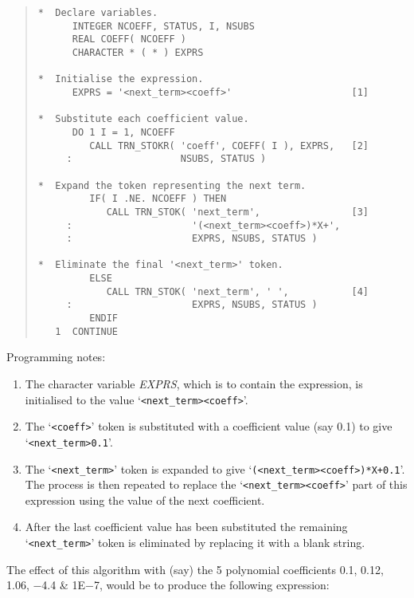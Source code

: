 \documentclass[twoside,11pt]{article}
\renewcommand{\_}{\texttt{\symbol{95}}}
\newcommand{\fortvar}[1]{\mbox{\emph{#1}}}
\begin{document}
\begin{quote}
\begin{verbatim}
*  Declare variables.
      INTEGER NCOEFF, STATUS, I, NSUBS
      REAL COEFF( NCOEFF )
      CHARACTER * ( * ) EXPRS

*  Initialise the expression.
      EXPRS = '<next_term><coeff>'                     [1]

*  Substitute each coefficient value.
      DO 1 I = 1, NCOEFF
         CALL TRN_STOKR( 'coeff', COEFF( I ), EXPRS,   [2]
     :                   NSUBS, STATUS )

*  Expand the token representing the next term.
         IF( I .NE. NCOEFF ) THEN
            CALL TRN_STOK( 'next_term',                [3]
     :                     '(<next_term><coeff>)*X+',
     :                     EXPRS, NSUBS, STATUS )

*  Eliminate the final '<next_term>' token.
         ELSE
            CALL TRN_STOK( 'next_term', ' ',           [4]
     :                     EXPRS, NSUBS, STATUS )
         ENDIF
   1  CONTINUE

\end{verbatim}
\end{quote}

Programming notes:

\begin{enumerate}

\item The character variable \fortvar{EXPRS}, which is to contain the
expression, is initialised to the value `\verb#<next_term><coeff>#'.

\item The `\verb#<coeff>#' token is substituted with a coefficient
value (say 0.1) to give `\verb#<next_term>0.1#'.

\item The `\verb#<next_term>#' token is expanded to give
`\verb#(<next_term><coeff>)*X+0.1#'.
The process is then repeated to replace the `\verb#<next_term><coeff>#'
part of this expression using the value of the next coefficient.

\item After the last coefficient value has been substituted the remaining
`\verb#<next_term>#' token is eliminated by replacing it with a blank
string.

\end{enumerate}

The effect of this algorithm with (say) the 5 polynomial coefficients 0.1,
0.12, 1.06, $-$4.4 \& 1E$-$7, would be to produce the following expression:
\end{document}
